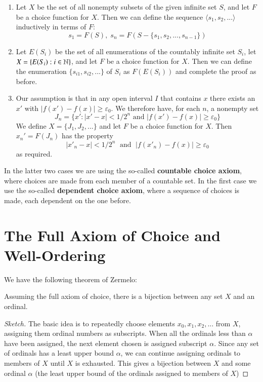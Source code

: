 \documentclass[12pt, a4paper, oneside, openright, titlepage]{book}
\begin{document}
\begin{enumerate}
    \item Let $X$ be the set of all nonempty subsets of the given infinite set $S$, and let $F$ be a choice function for $X$. Then we can define the sequence $\langle s_1,s_2,...\rangle$ inductively in terms of $F$: \begin{equation*}
            s_1 = F(S),\;s_n = F(S-\{s_1,s_2,...,s_{n-1}\})
    \end{equation*}
    \item Let $E(S_i)$ be the set of all enumerations of the countably infinite set $S_i$, let $X = \{E(S_i):i \in \mathbb N\}$, and let $F$ be a choice function for $X$. Then we can define the enumeration $\{s_{i1},s_{i2},...\}$ of $S_i$ as $F(E(S_i))$ and complete the proof as before.
    \item Our assumption is that in any open interval $I$ that contains $x$ there exists an $x'$ with $|f(x')-f(x)| \geq \varepsilon_0$. We therefore have, for each $n$, a nonempty set $$J_n = \{x':|x'-x| < 1/2^n\text{ and }|f(x')-f(x)|\geq \varepsilon_0\}$$
        We define $X = \{J_1,J_2,...\}$ and let $F$ be a choice function for $X$. Then $x_n' = F(J_n)$ has the property $$|x'_n - x| < 1/2^n\;\text{ and }\;|f(x'_n)-f(x)| \geq \varepsilon_0$$
        as required.
\end{enumerate}
In the latter two cases we are using the so-called \textbf{countable choice axiom}, where choices are made from each member of a countable set. In the first case we use the so-called \textbf{dependent choice axiom}, where a sequence of choices is made, each dependent on the one before.


\section{The Full Axiom of Choice and Well-Ordering}


We have the following theorem of Zermelo:

\begin{thm}
    Assuming the full axiom of choice, there is a bijection between any set $X$ and an ordinal.
\end{thm}
\begin{proof}[Sketch]
    The basic idea is to repeatedly choose elements $x_0,x_1,x_2,...$ from $X$, assigning them ordinal numbers as subscripts. When all the ordinals less than $\alpha$ have been assigned, the next element chosen is assigned subscript $\alpha$. Since any set of ordinals has a least upper bound $\alpha$, we can continue assigning ordinals to members of $X$ until $X$ is exhausted. This gives a bijection between $X$ and some ordinal $\alpha$ (the least upper bound of the ordinals assigned to members of $X$)
\end{proof}
\end{document}
